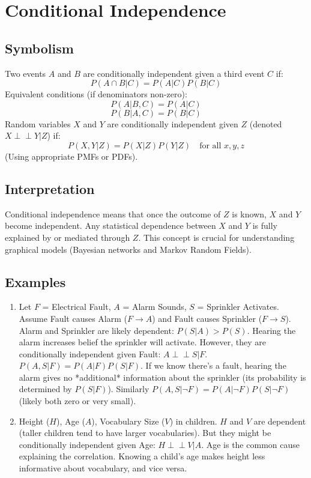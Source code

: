 \documentclass{article}
\newcommand{\Indep}{\perp \!\!\! \perp} %
\begin{document}
\section{Conditional Independence}

\subsection*{Symbolism}
Two events $A$ and $B$ are conditionally independent given a third event $C$ if:
\[ P(A \cap B | C) = P(A|C) P(B|C) \]
Equivalent conditions (if denominators non-zero):
\[ P(A | B, C) = P(A|C) \]
\[ P(B | A, C) = P(B|C) \]
Random variables $X$ and $Y$ are conditionally independent given $Z$ (denoted $X \Indep Y | Z$) if:
\[ P(X, Y | Z) = P(X|Z) P(Y|Z) \quad \text{for all } x, y, z \]
(Using appropriate PMFs or PDFs).

\subsection*{Interpretation}
Conditional independence means that once the outcome of $Z$ is known, $X$ and $Y$ become independent. Any statistical dependence between $X$ and $Y$ is fully explained by or mediated through $Z$. This concept is crucial for understanding graphical models (Bayesian networks and Markov Random Fields).

\subsection*{Examples}
\begin{enumerate}
    \item Let $F$ = Electrical Fault, $A$ = Alarm Sounds, $S$ = Sprinkler Activates.
    Assume Fault causes Alarm ($F \to A$) and Fault causes Sprinkler ($F \to S$).
    Alarm and Sprinkler are likely dependent: $P(S|A) > P(S)$. Hearing the alarm increases belief the sprinkler will activate.
    However, they are conditionally independent given Fault: $A \Indep S | F$.
    $P(A, S | F) = P(A|F) P(S|F)$. If we know there's a fault, hearing the alarm gives no *additional* information about the sprinkler (its probability is determined by $P(S|F)$). Similarly $P(A, S | \neg F) = P(A|\neg F) P(S|\neg F)$ (likely both zero or very small).
    \item Height ($H$), Age ($A$), Vocabulary Size ($V$) in children.
    $H$ and $V$ are dependent (taller children tend to have larger vocabularies).
    But they might be conditionally independent given Age: $H \Indep V | A$. Age is the common cause explaining the correlation. Knowing a child's age makes height less informative about vocabulary, and vice versa.
\end{enumerate}
\end{document}
